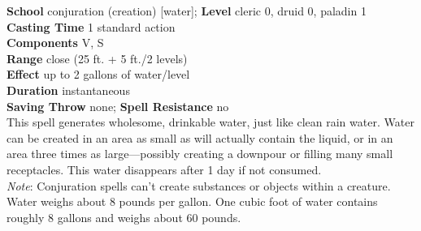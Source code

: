 \textbf{School} conjuration (creation) [water]; \textbf{Level} cleric 0, druid 0, paladin 1\\
\textbf{Casting Time} 1 standard action\\
\textbf{Components} V, S\\
\textbf{Range} close (25 ft. + 5 ft./2 levels)\\
\textbf{Effect} up to 2 gallons of water/level\\
\textbf{Duration} instantaneous\\
\textbf{Saving Throw} none; \textbf{Spell Resistance} no\\
This spell generates wholesome, drinkable water, just like clean rain water. Water can be created in an area as small as will actually contain the liquid, or in an area three times as large---possibly creating a downpour or filling many small receptacles. This water disappears after 1 day if not consumed.\\
\textit{Note}: Conjuration spells can't create substances or objects within a creature. Water weighs about 8 pounds per gallon. One cubic foot of water contains roughly 8 gallons and weighs about 60 pounds.\\
